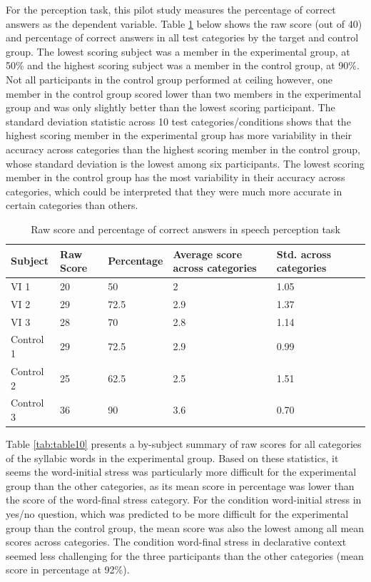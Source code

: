 \documentclass[a4paper]{article}
\begin{document}
For the perception task, this pilot study measures the percentage of correct answers as the dependent variable. Table \ref{tab:table9} below shows the raw score (out of 40) and percentage of correct answers in all test categories by the target and control group. The lowest scoring subject was a member in the experimental group, at 50\% and the highest scoring subject was a member in the control group, at 90\%. Not all participants in the control group performed at ceiling however, one member in the control group scored lower than two members in the experimental group and was only slightly better than the lowest scoring participant. The standard deviation statistic across 10 test categories/conditions shows that the highest scoring member in the experimental group has more variability in their accuracy across categories than the highest scoring member in the control group, whose standard deviation is the lowest among six participants. The lowest scoring member in the control group has the most variability in their accuracy across categories, which could be interpreted that they were much more accurate in certain categories than others.

\begin{table}[H]
  \begin{center}
    \caption{Raw score and percentage of correct answers in speech perception task}
    \label{tab:table9}
      \begin{tabular}{|p{2cm}|p{2cm}|p{2cm}|p{2cm}|p{2cm}|p{2cm}}
      \hline
        Subject & Raw Score & Percentage & Average score  across categories  & Std. across categories \\
      \hline
     VI 1 & 20 & 50 & 2 & 1.05 \\
           \hline
     VI 2 & 29 & 72.5 & 2.9 & 1.37 \\
           \hline
     VI 3 & 28 & 70 & 2.8  & 1.14 \\
           \hline
     Control 1 & 29 & 72.5 & 2.9 & 0.99\\
           \hline
     Control 2 & 25 & 62.5 & 2.5 & 1.51 \\
           \hline
     Control 3 & 36 & 90 & 3.6 &  0.70\\
      \hline

    \end{tabular}
  \end{center}
\end{table}

Table \ref{tab:table10} presents a by-subject summary of raw scores for all categories of the syllabic words in the experimental group. Based on these statistics, it seems the word-initial stress was particularly more difficult for the experimental group than the other categories, as its mean score in percentage was lower than the score of the word-final stress category. For the condition word-initial stress in yes/no question, which was predicted to be more difficult for the experimental group than the control group, the mean score was also the lowest among all mean scores across categories. The condition word-final stress in declarative context seemed less challenging for the three participants than the other categories (mean score in percentage at 92\%).
\end{document}
